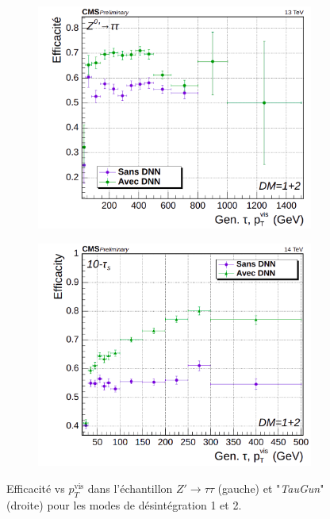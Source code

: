 \begin{figure}
  \begin{subfigure}{0.5\linewidth}
    \centering
    \includegraphics[width=\linewidth]{Chapitre4/Images/HPSnewDM12s_zptt_pt.png} 
  \end{subfigure}
  \begin{subfigure}{0.5\linewidth}
    \centering
    \includegraphics[width=\linewidth]{Chapitre4/Images/HPSnewDM12s_10t_pt.png} 
  \end{subfigure} 
  \caption{Efficacité vs $p_T^{\text{vis}}$ dans l'échantillon $Z'\rightarrow\tau\tau$ (gauche) et "\textit{TauGun}" (droite) pour les modes de désintégration 1 et 2.}
  \label{DM12}
\end{figure}